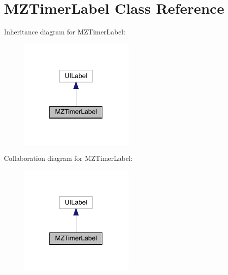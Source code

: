 \hypertarget{interface_m_z_timer_label}{}\section{M\+Z\+Timer\+Label Class Reference}
\label{interface_m_z_timer_label}


Inheritance diagram for M\+Z\+Timer\+Label\+:\nopagebreak
\begin{figure}[H]
\begin{center}
\leavevmode
\includegraphics[width=160pt]{interface_m_z_timer_label__inherit__graph}
\end{center}
\end{figure}


Collaboration diagram for M\+Z\+Timer\+Label\+:\nopagebreak
\begin{figure}[H]
\begin{center}
\leavevmode
\includegraphics[width=160pt]{interface_m_z_timer_label__coll__graph}
\end{center}
\end{figure}
